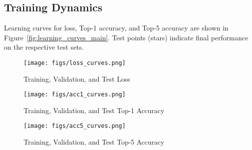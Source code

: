 \documentclass[10pt,twocolumn,letterpaper]{article}
\begin{document}
\subsection{Training Dynamics}
\label{ssec:training_dynamics}
Learning curves for loss, Top-1 accuracy, and Top-5 accuracy are shown in Figure~\ref{fig:learning_curves_main}. Test points (stars) indicate final performance on the respective test sets.

\begin{figure*}[htbp!] %
    \centering
    \begin{subfigure}{\textwidth}
        \centering
        \texttt{[image: figs/loss\_curves.png]}
        \caption{Training, Validation, and Test Loss}
        \label{fig:loss_curves_sub_main}
    \end{subfigure}
    \vfill %
    \begin{subfigure}{0.49\textwidth}
        \texttt{[image: figs/acc1\_curves.png]}
        \caption{Training, Validation, and Test Top-1 Accuracy}
        \label{fig:acc1_curves_sub_main}
    \end{subfigure}
    \hfill
    \begin{subfigure}{0.49\textwidth}
        \texttt{[image: figs/acc5\_curves.png]}
        \caption{Training, Validation, and Test Top-5 Accuracy}
        \label{fig:acc5_curves_sub_main}
    \end{subfigure}
    \caption{Learning curves for all four experimental configurations, showing (a) Cross-Entropy Loss, (b) Top-1 Accuracy, and (c) Top-5 Accuracy for training (solid lines), validation (dashed lines), and final test points (stars) across 200 epochs.}
    \label{fig:learning_curves_main}
\end{figure*}
\end{document}
